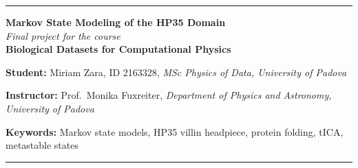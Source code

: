 \documentclass[prl,twocolumn]{revtex4-1}
\begin{document}
\onecolumngrid

\vspace{-1.5em}

\begin{center}
\rule{0.92\linewidth}{0.4pt}

\vspace{0.8em}

\begin{minipage}{0.86\linewidth}
\centering
\textbf{\large Markov State Modeling of the HP35 Domain} \\[0.25em]
\textit{Final project for the course}\\[0.25em]
\textbf{Biological Datasets for Computational Physics}

\vspace{0.8em}

\textbf{Student:} Miriam Zara, ID 2163328, \textit{MSc Physics of Data, University of Padova}

\vspace{0.25em}

\textbf{Instructor:} Prof.\ Monika Fuxreiter,
\textit{Department of Physics and Astronomy, University of Padova}

\vspace{0.8em}

\textbf{Keywords:}
Markov state models, HP35 villin headpiece, protein folding, tICA, metastable states

\end{minipage}

\vspace{0.8em}

\rule{0.92\linewidth}{0.4pt}
\end{center}

\vspace{2.5em}

\twocolumngrid
\end{document}
